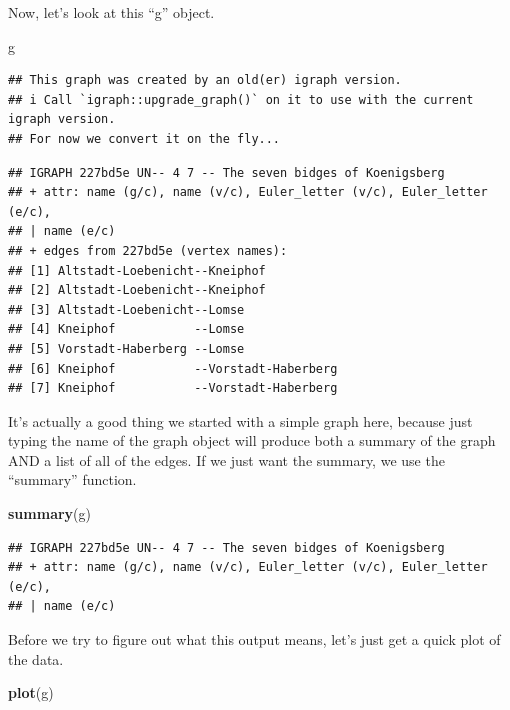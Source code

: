 \documentclass[
]{article}
\newenvironment{Shaded}{\begin{snugshade}}{\end{snugshade}}
\newcommand{\FunctionTok}[1]{\textcolor[rgb]{0.13,0.29,0.53}{\textbf{#1}}}
\newcommand{\NormalTok}[1]{#1}
\begin{document}
Now, let's look at this ``g'' object.\\

\begin{Shaded}
\begin{Highlighting}[]
\NormalTok{g}
\end{Highlighting}
\end{Shaded}

\begin{verbatim}
## This graph was created by an old(er) igraph version.
## i Call `igraph::upgrade_graph()` on it to use with the current igraph version.
## For now we convert it on the fly...
\end{verbatim}

\begin{verbatim}
## IGRAPH 227bd5e UN-- 4 7 -- The seven bidges of Koenigsberg
## + attr: name (g/c), name (v/c), Euler_letter (v/c), Euler_letter (e/c),
## | name (e/c)
## + edges from 227bd5e (vertex names):
## [1] Altstadt-Loebenicht--Kneiphof          
## [2] Altstadt-Loebenicht--Kneiphof          
## [3] Altstadt-Loebenicht--Lomse             
## [4] Kneiphof           --Lomse             
## [5] Vorstadt-Haberberg --Lomse             
## [6] Kneiphof           --Vorstadt-Haberberg
## [7] Kneiphof           --Vorstadt-Haberberg
\end{verbatim}

It's actually a good thing we started with a simple graph here, because
just typing the name of the graph object will produce both a summary of
the graph AND a list of all of the edges. If we just want the summary,
we use the ``summary'' function.

\begin{Shaded}
\begin{Highlighting}[]
\FunctionTok{summary}\NormalTok{(g)}
\end{Highlighting}
\end{Shaded}

\begin{verbatim}
## IGRAPH 227bd5e UN-- 4 7 -- The seven bidges of Koenigsberg
## + attr: name (g/c), name (v/c), Euler_letter (v/c), Euler_letter (e/c),
## | name (e/c)
\end{verbatim}

Before we try to figure out what this output means, let's just get a
quick plot of the data.

\begin{Shaded}
\begin{Highlighting}[]
\FunctionTok{plot}\NormalTok{(g)}
\end{Highlighting}
\end{Shaded}
\end{document}
